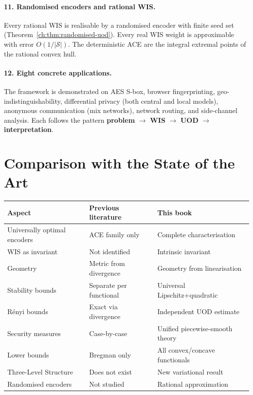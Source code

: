 \paragraph{11. Randomised encoders and rational WIS.}
Every rational WIS is realisable by a randomised encoder with finite
seed set (Theorem~\ref{ch:thm:randomised-uod}).  Every real WIS weight is approximable with
error $O(1/|\mathcal S|)$.  The deterministic ACE are the integral
extremal points of the rational convex hull.

\paragraph{12. Eight concrete applications.}
The framework is demonstrated on AES S-box, browser fingerprinting,
geo-indistinguishability, differential privacy (both central and local
models), anonymous communication (mix networks), network routing, and
side-channel analysis.  Each follows the pattern
\textbf{problem} $\to$ \textbf{WIS} $\to$ \textbf{UOD}
$\to$ \textbf{interpretation}.

\section{Comparison with the State of the Art}\label{ch:sec:comparison-with-the-state-of-the-art}

\begin{center}
\begin{tabular}{lll}
\textbf{Aspect} & \textbf{Previous literature} & \textbf{This book} \\ \hline
Universally optimal encoders & ACE family only \cite{biondi2018apollonian} & Complete characterisation \\
WIS as invariant & Not identified & Intrinsic invariant \\
Geometry & Metric from divergence & Geometry from linearisation \\
Stability bounds & Separate per functional & Universal Lipschitz+quadratic \\
R\'enyi bounds & Exact via divergence \cite{vanerven2014renyi} & Independent UOD estimate \\
Security measures & Case-by-case & Unified piecewise-smooth theory \\
Lower bounds & Bregman only & All convex/concave functionals \\
Three-Level Structure & Does not exist & New variational result \\
Randomised encoders & Not studied & Rational approximation \\
\end{tabular}
\end{center}

